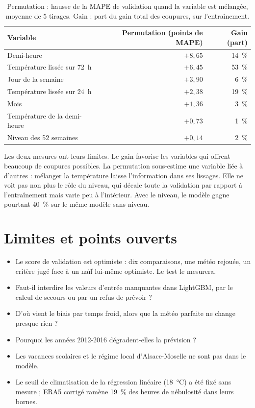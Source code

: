 \documentclass[11pt,a4paper]{article}
\begin{document}
\begin{table}[H]
\small
\begin{tabularx}{\linewidth}{Yrr}
\toprule
\textbf{Variable} & \textbf{Permutation (points de MAPE)} & \textbf{Gain (part)} \\
\midrule
Demi-heure & $+8{,}65$ & 14~\% \\
Température lissée sur 72~h & $+6{,}45$ & 53~\% \\
Jour de la semaine & $+3{,}90$ & 6~\% \\
Température lissée sur 24~h & $+2{,}38$ & 19~\% \\
Mois & $+1{,}36$ & 3~\% \\
Température de la demi-heure & $+0{,}73$ & 1~\% \\
Niveau des 52 semaines & $+0{,}14$ & 2~\% \\
\bottomrule
\end{tabularx}
\caption{Permutation : hausse de la MAPE de validation quand la variable est mélangée, moyenne de 5 tirages. Gain : part du gain total des coupures, sur l'entraînement.}
\end{table}

Les deux mesures ont leurs limites. Le gain favorise les variables qui offrent beaucoup de coupures possibles. La permutation sous-estime une variable liée à d'autres : mélanger la température laisse l'information dans ses lissages. Elle ne voit pas non plus le rôle du niveau, qui décale toute la validation par rapport à l'entraînement mais varie peu à l'intérieur. Avec le niveau, le modèle gagne pourtant 40~\% sur le même modèle sans niveau.

\section{Limites et points ouverts}

\begin{itemize}
  \item Le score de validation est optimiste : dix comparaisons, une météo rejouée, un critère jugé face à un naïf lui-même optimiste. Le test le mesurera.
  \item Faut-il interdire les valeurs d'entrée manquantes dans LightGBM, par le calcul de secours ou par un refus de prévoir ?
  \item D'où vient le biais par temps froid, alors que la météo parfaite ne change presque rien ?
  \item Pourquoi les années 2012-2016 dégradent-elles la prévision ?
  \item Les vacances scolaires et le régime local d'Alsace-Moselle ne sont pas dans le modèle.
  \item Le seuil de climatisation de la régression linéaire (18~°C) a été fixé sans mesure ; ERA5 corrigé ramène 19~\% des heures de nébulosité dans leurs bornes.
\end{itemize}
\end{document}
